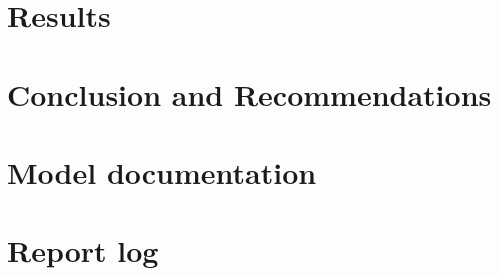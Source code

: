 \documentclass[a4paper,11, oneside]{article}
\begin{document}
\section{Results}
\label{ch:results}

\pagebreak

\section{Conclusion and Recommendations}
\label{ch:conclusion}

\pagebreak

\printbibliography


%
\pagebreak


\appendix
\section{Model documentation}
\label{ch:model_documentation}

\section{Report log}
\label{ch:report_log}





\end{document}
